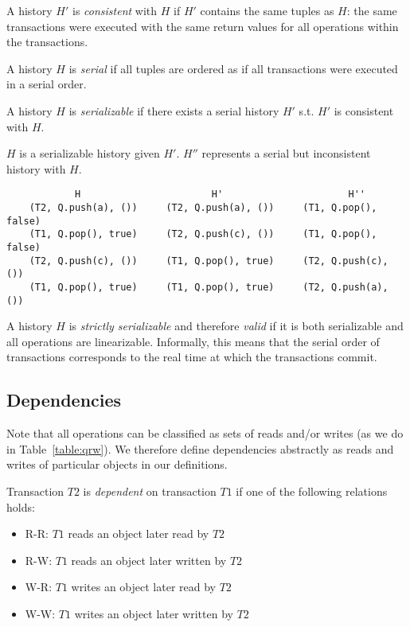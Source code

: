 \begin{defn}
    A history $H'$ is \emph{consistent} with $H$ if $H'$ contains the same tuples as $H$: the same transactions were executed with the same return values for all operations within the transactions.
\end{defn}

\begin{defn}
    A history $H$ is \emph{serial} if all tuples are ordered as if all transactions were executed in a serial order.
\end{defn}
\begin{defn}
    A history $H$ is \emph{serializable} if there exists a serial history $H'$ s.t. $H'$ is consistent with $H$.

\end{defn}

\begin{eg}
$H$ is a serializable history given $H'$. $H''$ represents a serial but inconsistent history with $H$.
\begin{lstlisting}
            H                       H'                      H'' 
    (T2, Q.push(a), ())     (T2, Q.push(a), ())     (T1, Q.pop(), false)
    (T1, Q.pop(), true)     (T2, Q.push(c), ())     (T1, Q.pop(), false)
    (T2, Q.push(c), ())     (T1, Q.pop(), true)     (T2, Q.push(c), ())
    (T1, Q.pop(), true)     (T1, Q.pop(), true)     (T2, Q.push(a), ()) 
\end{lstlisting}
\end{eg}

\begin{defn}
    A history $H$ is \emph{strictly serializable} and therefore \emph{valid} if it is both serializable and all operations are linearizable. Informally, this means that the serial order of transactions corresponds to the real time at which the transactions commit.
\end{defn}

\subsection{Dependencies}

Note that all operations can be classified as sets of reads and/or writes (as we do in Table~\ref{table:qrw}). We therefore define dependencies abstractly as reads and writes of particular objects in our definitions.

\begin{defn}
    Transaction $T2$ is \emph{dependent} on transaction $T1$ if one of the following relations holds:
    \begin{itemize}
        \item R-R: $T1$ reads an object later read by $T2$
        \item R-W: $T1$ reads an object later written by $T2$
        \item W-R: $T1$ writes an object later read by $T2$
        \item W-W: $T1$ writes an object later written by $T2$
    \end{itemize}
\end{defn}

